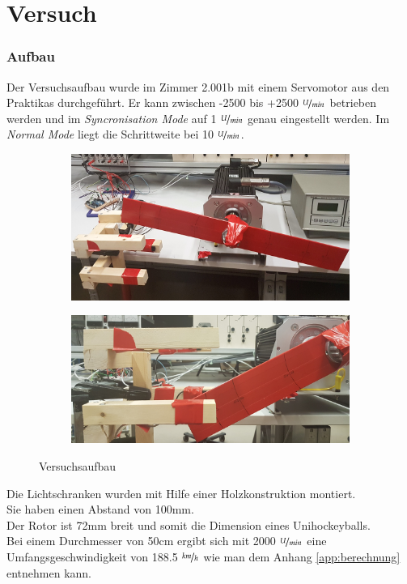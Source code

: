 \part{Versuch}
\section{Aufbau}
Der Versuchsaufbau wurde im Zimmer 2.001b mit einem Servomotor aus den Praktikas durchgeführt. Er kann zwischen -2500 bis +2500 $\nicefrac{U}{min}$ betrieben werden und im \textit{Syncronisation Mode} auf 1 $\nicefrac{U}{min}$ genau eingestellt werden. Im \textit{Normal Mode} liegt die Schrittweite bei 10 $\nicefrac{U}{min}$.

\begin{figure}[ht]
    \centering
    \begin{subfigure}[c]{0.8\textwidth}       
        \includegraphics[width=\textwidth]{images/Aufbau.jpg}
    \end{subfigure}

    \begin{subfigure}[c]{0.8\textwidth}
        \includegraphics[width=\textwidth]{images/AufbauDetail.jpg}
    \end{subfigure}
    \caption{Versuchsaufbau}\label{fig:Aufbau}   
\end{figure}

Die Lichtschranken wurden mit Hilfe einer Holzkonstruktion montiert.\\
Sie haben einen Abstand von 100mm.\\
Der  Rotor ist 72mm breit und somit die Dimension eines Unihockeyballs.\\

Bei einem Durchmesser von 50cm ergibt sich mit 2000 $\nicefrac{U}{min}$ eine Umfangsgeschwindigkeit von 188.5 $\nicefrac{km}{h}$ wie man dem Anhang \ref{app:berechnung} entnehmen kann.